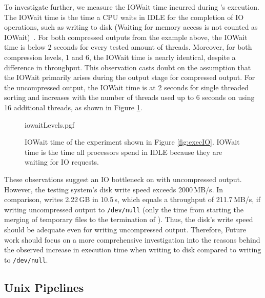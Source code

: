 To investigate further, we measure the IOWait time incurred during \sort's execution. The IOWait time is the time a CPU waits in IDLE for the completion of IO operations, such as writing to disk (Waiting for memory access is not counted as IOWait)~\cite{noauthor_iostat1_nodate}. For both compressed outputs from the example above, the IOWait time is below 2 seconds for every tested amount of threads. Moreover, for both compression levels, 1 and 6, the IOWait time is nearly identical, despite a difference in throughput. This observation casts doubt on the assumption that the IOWait primarily arises during the output stage for compressed output. For the uncompressed output, the IOWait time is at 2 seconds for single threaded sorting and increases with the number of threads used up to 6 seconds on using 16 additional threads, as shown in Figure \ref{fig:iowait}.
\begin{figure}
        {iowaitLevels.pgf}
    \caption{IOWait time of the experiment shown in Figure \ref{fig:execIO}. IOWait time is the time all processors spend in IDLE because they are waiting for IO requests. \threads \points 
    }
    \label{fig:iowait}
\end{figure}

These observations suggest an IO bottleneck on \sort with uncompressed output. However, the testing system's disk write speed exceeds 2000\,MB/s. In comparison, \sort writes 2.22\,GB in 10.5\,s, which equals a throughput of 211.7\,MB/s, if writing uncompressed output to \texttt{/dev/null} (only the time from starting the merging of temporary files to the termination of \sort). Thus, the disk's write speed should be adequate even for writing uncompressed output. Therefore, Future work should focus on a more comprehensive investigation into the reasons behind the observed increase in execution time when writing to disk compared to writing to \texttt{/dev/null}.



\subsection{Unix Pipelines}

